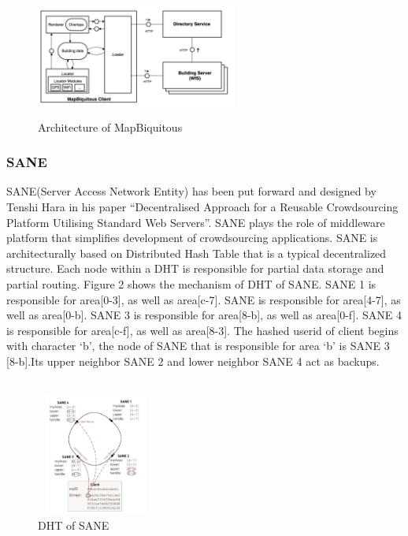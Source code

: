 \documentclass[12pt,oneside,a4paper]{article}
\begin{document}
\begin{figure}[htb]
\centering
\includegraphics[width=250px, height=150px]{mapbiquitous.png}
\caption{Architecture of MapBiquitous}
\label{picture-label0}
\end{figure}
\subsubsection{SANE}
SANE(Server Access Network Entity) has been put forward and designed by Tenshi Hara in his paper ``Decentralised Approach for a Reusable Crowdsourcing Platform Utilising Standard Web Servers''. SANE plays the role of middleware platform that simplifies development of crowdsourcing applications. SANE is architecturally based on Distributed Hash Table that is a typical decentralized structure. Each node within a DHT is responsible for partial data storage and partial routing. Figure 2 shows the mechanism of DHT of SANE. SANE 1 is responsible for area[0-3], as well as area[c-7]. SANE is responsible for area[4-7], as well as area[0-b]. SANE 3 is responsible for area[8-b], as well as area[0-f]. SANE 4 is responsible for area[c-f], as well as area[8-3]. The hashed userid of client begins with character `b', the node of SANE that is responsible for area `b' is SANE 3 [8-b].Its upper neighbor SANE 2 and lower neighbor SANE 4 act as backups.\\\\
\begin{figure}[htb]
\centering
\includegraphics[width=150px, height=150px]{sanedht.png}
\caption{DHT of SANE}
\label{picture-label01}
\end{figure}
\end{document}
